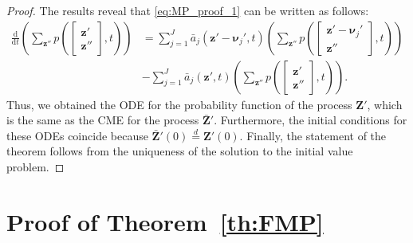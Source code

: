 \begin{proof}
    The results reveal that \eqref{eq:MP_proof_1} can be written as follows:
    \begin{align*}
        \frac{\mathrm{d}}{\mathrm{d} t} \left( \sum_{{\boldsymbol{z}}'' } p\left( \begin{bmatrix} \boldsymbol{z}' \\ {\boldsymbol{z}}'' \end{bmatrix}, t \right) \right) 
        &= \sum_{j=1}^{J} \bar{a}_j (\boldsymbol{z}' - \boldsymbol{\nu}_j', t) \left( \sum_{{\boldsymbol{z}}'' } p\left( \begin{bmatrix} \boldsymbol{z}' - \boldsymbol{\nu}_j' \\ {\boldsymbol{z}}'' \end{bmatrix}, t \right) \right) \\
        &- \sum_{j=1}^{J} \bar{a}_j (\boldsymbol{z}', t) \left( \sum_{{\boldsymbol{z}}'' } p\left( \begin{bmatrix} \boldsymbol{z}' \\ {\boldsymbol{z}}'' \end{bmatrix}, t \right) \right) .
    \end{align*}
    Thus, we obtained the \ac{ODE} for the probability function of the process $\boldsymbol{Z}'$, which is the same as the \ac{CME} for the process $\bar{\boldsymbol{Z}}'$. Furthermore, the initial conditions for these \acp{ODE} coincide because $\bar{\boldsymbol{Z}}'(0) \overset{d}{=} \boldsymbol{Z}'(0)$. Finally, the statement of the theorem follows from the uniqueness of the solution to the initial value problem.
\end{proof}







\section{Proof of Theorem~\ref{th:FMP}}
\label{sec:FMP_proof}

